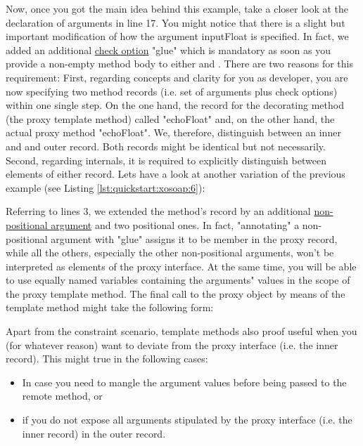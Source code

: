 Now, once you got the main idea behind this example, take a closer look  at the declaration of 
arguments in line 17. You might notice that there is a slight but important modification of how the 
argument inputFloat is specified. In fact, we added an additional \href{http://media.wu-wien.ac.at/doc/tutorial.html#non-pos-args}{check option} "glue" which is 
mandatory as soon as you provide a non-empty method body to either  and . There 
are two reasons for this requirement: First, regarding concepts and clarity for you as developer, you are 
now specifying two method records (i.e. set of arguments plus check options)  within one single step. On 
the one hand, the record for the decorating method (the proxy template method) called "echoFloat" and, 
on the other hand, the actual proxy method "echoFloat". We, therefore, distinguish between an inner and 
and outer record. Both records might be identical but not necessarily. Second, regarding internals, it is 
required to explicitly distinguish between elements of either record. Lets have a look at another variation 
of the previous example (see Listing \ref{lst:quickstart:xosoap:6}):
%

%
Referring to lines 3, we extended the method's record by an additional \href{http://media.wu-wien.ac.at/doc/tutorial.html#non-pos-args}{non-positional argument} and 
two positional ones. In fact, "annotating" a non-positional argument with "glue" assigns it to be member in the proxy record, while all the others, especially the other non-positional arguments, won't be 
interpreted as elements of the proxy interface. At the same time, you will be able to use equally named 
variables containing the arguments" values in the scope of the proxy template method. The final call to 
the proxy object by means of the template method might take the following form:
%

%
Apart from the constraint scenario, template methods also proof useful when you (for whatever reason) 
want to deviate from the proxy interface (i.e. the inner record). This might true in the following cases:
\begin{itemize}
\item In case you need to mangle the argument values before being passed to the remote method, or
\item if you do not expose all arguments stipulated by the proxy interface (i.e. the inner record) in the 
outer record.
\end{itemize}
